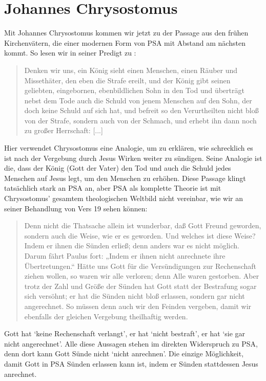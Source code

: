\section{Johannes Chrysostomus}
Mit Johannes Chrysostomus kommen wir jetzt zu der Passage aus den frühen Kirchenvätern, die einer modernen Form von PSA mit Abstand am nächsten kommt.
So lesen wir in seiner Predigt zu :
\begin{quote}
Denken wir uns, ein König sieht einen Menschen, einen Räuber und Missethäter, den eben die Strafe ereilt,
und der König gibt seinen geliebten, eingebornen, ebenbildlichen Sohn in den Tod und überträgt nebst dem Tode auch die Schuld von jenem Menschen auf den Sohn,
der doch keine Schuld auf sich hat, und befreit so den Verurtheilten nicht bloß von der Strafe,
sondern auch von der Schmach, und erhebt ihn dann noch zu großer Herrschaft: [...]
\end{quote}
Hier verwendet Chrysostomus eine Analogie, um zu erklären, wie schrecklich es ist nach der Vergebung durch Jesus Wirken weiter zu sündigen.
Seine Analogie ist die, dass der König (Gott der Vater) den Tod und auch die Schuld jedes Menschen auf Jesus legt, um den Menschen zu erhöhen.
Diese Passage klingt tatsächlich stark an PSA an, aber PSA als komplette Theorie ist mit Chrysostomus' gesamtem theologischen Weltbild nicht vereinbar, wie wir an seiner Behandlung von Vers 19 sehen können:
\begin{quote}
	Denn nicht die Thatsache allein ist wunderbar, daß Gott Freund geworden, sondern auch die Weise, wie er es geworden. Und welches ist diese Weise? Indem er ihnen die Sünden erließ; denn anders war es nicht möglich. Darum fährt Paulus fort: „Indem er ihnen nicht anrechnete ihre Übertretungen.“ Hätte uns Gott für die Versündigungen zur Rechenschaft ziehen wollen, so waren wir alle verloren; denn Alle waren gestorben. Aber trotz der Zahl und Größe der Sünden hat Gott statt der Bestrafung sogar sich versöhnt; er hat die Sünden nicht bloß erlassen, sondern gar nicht angerechnet. So müssen denn auch wir den Feinden vergeben, damit wir ebenfalls der gleichen Vergebung theilhaftig werden.
\end{quote}
Gott hat `keine Rechenschaft verlangt', er hat `nicht bestraft', er hat `sie gar nicht angerechnet'.
Alle diese Aussagen stehen im direkten Widerspruch zu PSA, denn dort kann Gott Sünde nicht `nicht anrechnen'.
Die einzige Möglichkeit, damit Gott in PSA Sünden erlassen kann ist, indem er Sünden stattdessen Jesus anrechnet.

